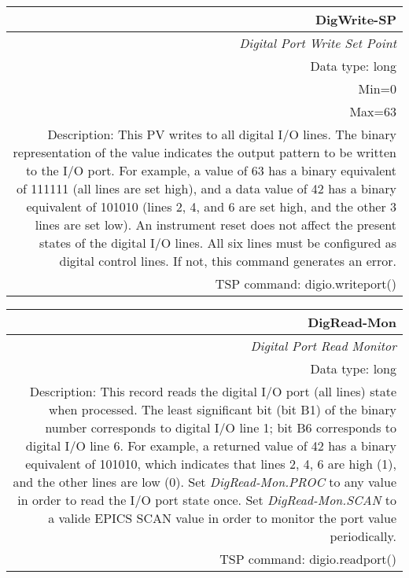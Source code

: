 \documentclass[openany]{article}
\begin{document}
		\begin{tabular}{N}
			\hline
			\bfseries DigWrite-SP\label{pv:digwrite-sp} \\ \hline
			\emph{Digital Port Write Set Point} \\
			Data type: long \\
			Min=0 \\ 
			Max=63 \\
			Description: This PV writes to all digital I/O lines. The binary representation of the value indicates the output pattern to be written to the I/O port. For example, a value of 63 has a binary equivalent of 111111 (all lines are set high), and a data value of 42 has a binary equivalent of 101010 (lines 2, 4, and 6 are set high, and the other 3 lines are set low). An instrument reset does not affect the present states of the digital I/O lines. All six lines must be configured as digital control lines. If not, this command generates an error. \\
			TSP command: digio.writeport()
		\end{tabular}

		\begin{tabular}{N}
			\hline
			\bfseries DigRead-Mon\label{pv:digread-mon} \\ \hline
			\emph{Digital Port Read Monitor} \\
			Data type: long \\
			Description: This record reads the digital I/O port (all lines) state when processed. The least significant bit (bit B1) of the binary number corresponds to digital I/O line 1; bit B6 corresponds to digital I/O line 6. For example, a returned value of 42 has a binary equivalent of 101010, which indicates that lines 2, 4, 6 are high (1), and the other lines are low (0). Set \emph{DigRead-Mon.PROC} to any value in order to read the I/O port state once. Set \emph{DigRead-Mon.SCAN} to a valide EPICS SCAN value in order to monitor the port value periodically. \\
			TSP command: digio.readport()
		\end{tabular}
\end{document}
